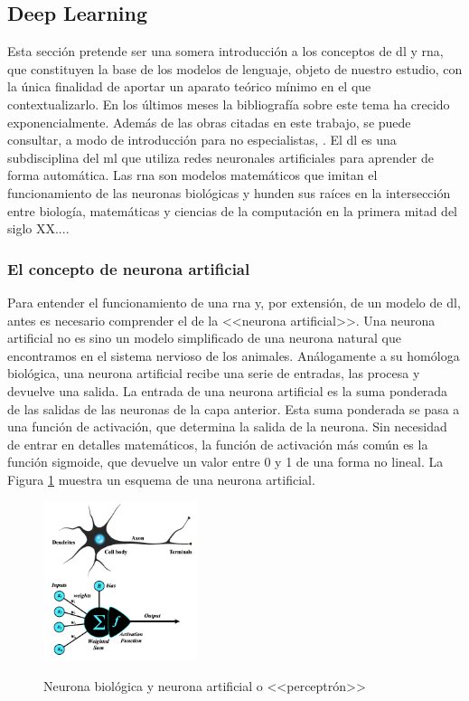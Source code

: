 \subsection{Deep Learning}

Esta sección pretende ser una somera introducción a los conceptos de \gls{dl} y \gls{rna}, que constituyen la base de los modelos de lenguaje, objeto de nuestro estudio, con la única finalidad de aportar un aparato teórico mínimo en el que contextualizarlo. En los últimos meses la bibliografía sobre este tema ha crecido exponencialmente. Además de las obras citadas en este trabajo, se puede consultar, a modo de introducción para no especialistas, \cite{BeginnerGuideNeural}. El \gls{dl} es una subdisciplina del \gls{ml} que utiliza redes neuronales artificiales para aprender de forma automática. Las \gls{rna} son modelos matemáticos que imitan el funcionamiento de las neuronas biológicas y hunden sus raíces en la intersección entre biología, matemáticas y ciencias de la computación en la primera mitad del siglo XX....

\subsubsection{El concepto de neurona artificial}

Para entender el funcionamiento de una \gls{rna} y, por extensión, de un modelo de \gls{dl}, antes es necesario comprender el de la <<neurona artificial>>. Una neurona artificial no es sino un modelo simplificado de una neurona natural que encontramos en el sistema nervioso de los animales. Análogamente a su homóloga biológica, una neurona artificial recibe una serie de entradas, las procesa y devuelve una salida. La entrada de una neurona artificial es la suma ponderada de las salidas de las neuronas de la capa anterior. Esta suma ponderada se pasa a una función de activación, que determina la salida de la neurona. Sin necesidad de entrar en detalles matemáticos, la función de activación más común es la función sigmoide, que devuelve un valor entre 0 y 1 de una forma no lineal. La Figura \ref{fig:neurona_artificial_natural} muestra un esquema de una neurona artificial. 

\begin{figure}[H]
    \caption[Neurona biológica y neurona artificial o <<perceptrón>>]{Neurona biológica y neurona artificial o <<perceptrón>>}
    \centering
    \includegraphics[width=0.4\textwidth]{./figuras/perceptron_with_neuron.png}
    \label{fig:neurona_artificial_natural}
\end{figure}

